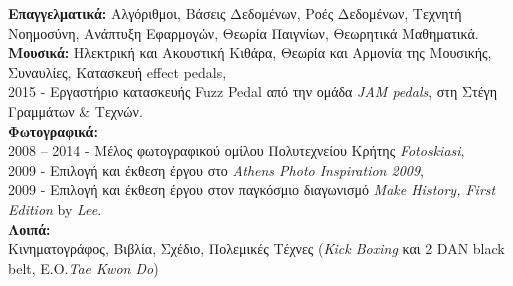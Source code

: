 \documentclass[print]{keros-cv} %
\begin{document}
\textbf{Επαγγελματικά:}
 Αλγόριθμοι,
 Βάσεις Δεδομένων,
 Ροές Δεδομένων,
 Τεχνητή Νοημοσύνη,
 Ανάπτυξη Εφαρμογών,
 Θεωρία Παιγνίων,
 Θεωρητικά Μαθηματικά.\\
\textbf{Μουσικά:}
 Ηλεκτρική και Ακουστική Κιθάρα,
 Θεωρία και Αρμονία της Μουσικής,
 Συναυλίες,
 Κατασκευή effect pedals,\\
 2015 - Εργαστήριο κατασκευής Fuzz Pedal από την ομάδα \textit{JAM pedals}, στη Στέγη Γραμμάτων \& Τεχνών.\\
 \textbf{Φωτογραφικά:}\\
 2008 -- 2014 - Μέλος φωτογραφικού ομίλου Πολυτεχνείου Κρήτης \textit{Fotoskiasi}, \\
 2009 - Επιλογή και έκθεση έργου στο \textit{Athens Photo Inspiration 2009},\\
 2009 - Επιλογή και έκθεση έργου στον παγκόσμιο διαγωνισμό \textit{Make History, First Edition} by \emph{Lee}.\\
\textbf{Λοιπά:}\\
 Κινηματογράφος, 
 Βιβλία, 
 Σχέδιο, 
 Πολεμικές Τέχνες (\textit{Kick Boxing} και 2 DAN black belt, Ε.Ο.\textit{Tae Kwon Do}) 

%
%
%
%
%
%
%

\end{document}
